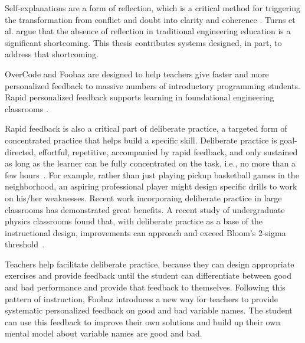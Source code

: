 Self-explanations are a form of reflection, which is a critical method for triggering the transformation from conflict and doubt into clarity and coherence \cite{dewey1933}. Turns et al. \cite{asee} argue that the absence of reflection in traditional engineering education is a significant shortcoming. This thesis contributes systems designed, in part, to address that shortcoming.




OverCode and Foobaz are designed to help teachers give faster and more personalized feedback to massive numbers of introductory programming students. Rapid personalized feedback supports learning in foundational engineering classrooms \cite{ieeeRapidFeedback}. 

Rapid feedback is also a critical part of deliberate practice, a targeted form of concentrated practice that helps build a specific skill. Deliberate practice is goal-directed, effortful, repetitive, accompanied by rapid feedback, and only sustained as long as the learner can be fully concentrated on the task, i.e., no more than a few hours~\cite{Gobet2012}. For example, rather than just playing pickup basketball games in the neighborhood, an aspiring professional player might design specific drills to work on his/her weaknesses. Recent work incorporaing deliberate practice in large classrooms has demonstrated great benefits. A recent study of undergraduate physics classrooms found that, with deliberate practice as a base of the instructional design, improvements can approach and exceed Bloom's 2-sigma threshold~\cite{Deslauriers862}.

Teachers help facilitate deliberate practice, because they can design appropriate exercises and provide feedback until the student can differentiate between good and bad performance and provide that feedback to themselves. Following this pattern of instruction, Foobaz introduces a new way for teachers to provide systematic personalized feedback on good and bad variable names. The student can use this feedback to improve their own solutions and build up their own mental model about variable names are good and bad.

